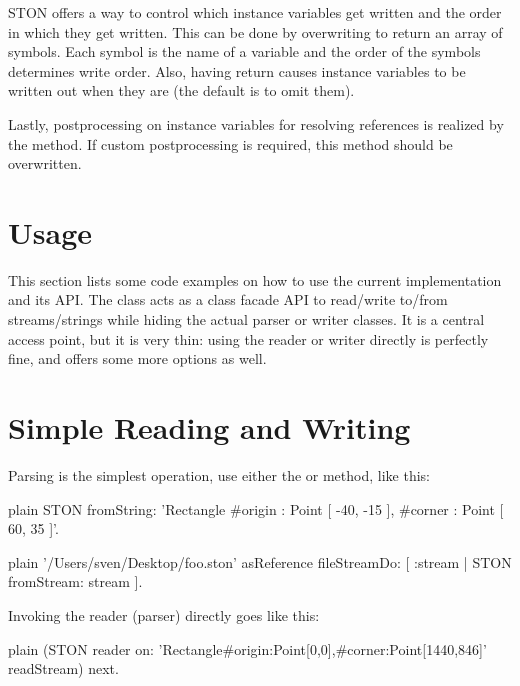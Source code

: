 \documentclass[10pt,twoside,english]{_support/latex/sbabook/sbabook}
\begin{document}
STON offers a way to control which instance variables get written and the order in which they get written.
This can be done by overwriting  to return an array of symbols. Each symbol is the name of a variable and the order of the
symbols determines write order. Also, having   return  causes instance variables to be written out when they are
 (the default is to omit them).

Lastly, postprocessing on instance variables for resolving references is realized by the  method. If custom postprocessing is
required, this method should be overwritten.
\section{Usage}
This section lists some code examples on how to use the current implementation and its API.
The class  acts as a class facade API to read/write to/from streams/strings
while hiding the actual parser or writer classes. It is a central access point, but it is very thin:
using the reader or writer directly is perfectly fine, and offers some more options as well.
\section{Simple Reading and Writing}
Parsing is the simplest operation, use either the  or  method, like this:

\begin{displaycode}{plain}
STON fromString: 'Rectangle { #origin : Point [ -40, -15 ],
   #corner : Point [ 60, 35 ]}'.
\end{displaycode}

\begin{displaycode}{plain}
'/Users/sven/Desktop/foo.ston' asReference
   fileStreamDo: [ :stream | STON fromStream: stream ].
\end{displaycode}

Invoking the reader (parser) directly goes like this:

\begin{displaycode}{plain}
(STON reader on:
   'Rectangle{#origin:Point[0,0],#corner:Point[1440,846]}'
      readStream) next.
\end{displaycode}
\end{document}
